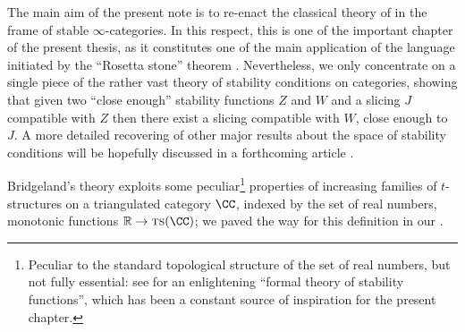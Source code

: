 The main aim of the present note is to re\hyp{}enact the classical theory of \cite{Brid} in the frame of stable $\infty$\hyp{}categories. In this respect, this is one of the important chapter of the present thesis, as it constitutes one of the main application of the language initiated by the ``Rosetta stone'' theorem . Nevertheless, we only concentrate on a single piece of the rather vast theory of stability conditions on categories, showing that given two ``close enough'' stability functions $Z$ and $W$ and a slicing $J$ compatible with $Z$ then there exist a slicing compatible with $W$, close enough to $J$. A more detailed  recovering of other major results about the space of stability conditions will be hopefully discussed in a forthcoming article \cite{infty-stab}.

Bridgeland's theory exploits some peculiar\footnote{Peculiar to the standard topological structure of the set of real numbers, but not fully essential: see \cite{GKR} for an enlightening ``formal theory of stability functions'', which has been a constant source of inspiration for the present chapter.} properties of increasing families of $t$\hyp{}structures on a triangulated category $\CC$, indexed by the set of real numbers, \ie monotonic functions $\mathbb R\to \textsc{ts}(\CC)$; we paved the way for this definition in our \achap {}.

